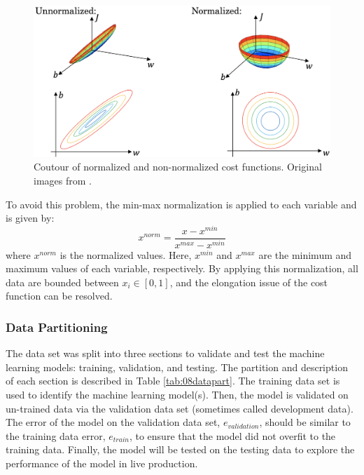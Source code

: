 \begin{figure}[h]
    \centering
    \includegraphics[width=1\textwidth]{images/08featscale.png}
    \caption{Coutour of normalized and non-normalized cost functions. Original images from \cite{deeplearning_course}.}
    \label{fig:08featscale}
\end{figure}

To avoid this problem, the min-max normalization is applied to each variable and is given by:
\begin{equation}
    x^{norm} = \frac{x - x^{min}}{x^{max} - x^{min}}
\end{equation}
where $x^{norm}$ is the normalized values.  Here, $x^{min}$ and $x^{max}$ are the minimum and maximum values of each variable, respectively.  By applying this normalization, all data are bounded between $x_i \in [0, 1]$, and the elongation issue of the cost function can be resolved.

\subsubsection{Data Partitioning}
The data set was split into three sections to validate and test the machine learning models: training, validation, and testing.  The partition and description of each section is described in Table \ref{tab:08datapart}. The training data set is used to identify the machine learning model(s).  Then, the model is validated on un-trained data via the validation data set (sometimes called development data).  The error of the model on the validation data set, $e_{validation}$, should be similar to the training data error, $e_{train}$, to ensure that the model did not overfit to the training data. Finally, the model will be tested on the testing data to explore the performance of the model in live production.

